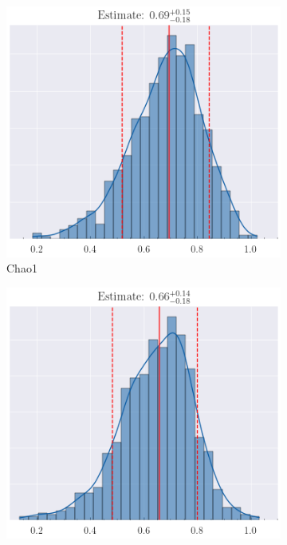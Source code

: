 \documentclass[a4paper,twoside,12pt]{book}
\begin{document}
\begin{figure}[h!]
	\centering
	
	\begin{subfigure}[b]{0.32\textwidth}
		\includegraphics[width=\textwidth]{img/chao1boot.png}
		\caption{Chao1}
		\label{fig:chao1}
	\end{subfigure}
	\hfill
	\begin{subfigure}[b]{0.32\textwidth}
		\includegraphics[width=\textwidth]{img/ichaoboot.png}

\end{subfigure}
\end{figure}
\end{document}
